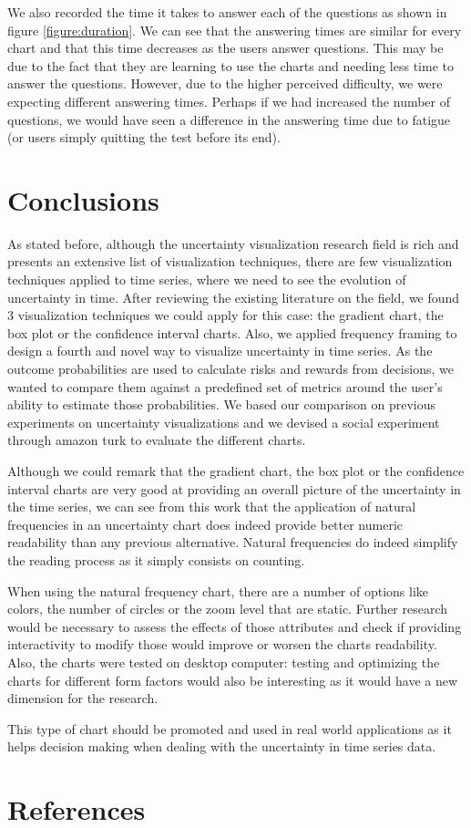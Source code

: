 \documentclass[a4paper,3p,sort&compress]{elsarticle}
\begin{document}
We also recorded the time it takes to answer each of the questions as shown in figure \ref{figure:duration}. We 
can see that the answering times are similar for every chart and that this time decreases as the users answer questions.
This may be due to the fact that they are learning to use the charts and needing less time to answer the questions.
However, due to the higher perceived difficulty, we were expecting different answering times. Perhaps if we had 
increased the number of questions, we would have seen a difference in the answering time due to fatigue (or users simply quitting the test 
before its end).


\section{Conclusions}
\label{sec:concl}

As stated before, although the uncertainty visualization research field is rich and presents an extensive list of visualization techniques, 
there are few 
visualization techniques applied to time series, where we need to see the evolution of uncertainty 
in time. After reviewing the existing literature on the field, we found 3 visualization techniques we could apply for this case:
the gradient chart, the box plot or the confidence interval charts. Also, we applied frequency framing 
to design a fourth and novel way to visualize uncertainty in time series.
As the outcome probabilities are used to calculate risks and rewards from decisions, we wanted to compare them against a predefined set of 
metrics around the user's ability to estimate those probabilities.
We based our comparison on previous experiments on uncertainty visualizations and we devised a social experiment through amazon turk to 
evaluate the different charts.

Although we could remark that the gradient chart, the box plot or the confidence interval charts are very good at 
providing an overall picture of the uncertainty in the time series, we can see from this work that the application of natural 
frequencies in an uncertainty chart does indeed
provide better numeric readability than any previous alternative. Natural frequencies do indeed simplify 
the reading process as it simply consists on counting.

When using the natural frequency chart, there are a number of options like colors, the number of circles or the 
zoom level that are static. Further research would be necessary to assess the effects of those 
attributes and check if providing interactivity to modify those would improve or worsen the charts readability. 
Also, the charts were tested on desktop computer: testing and optimizing the charts for different form factors
would also be interesting as it would have a new dimension for the research.

This type of chart should be promoted and used in real world applications as it helps decision making when 
dealing with the uncertainty in time series data. 

\section{References}
\label{sec:ref}



\end{document}

